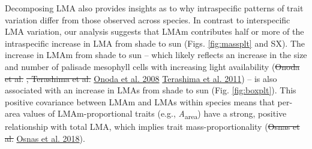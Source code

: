 \documentclass[
  12pt,
]{article}
\providecommand{\DIFaddtex}[1]{{\protect\color{blue}\uwave{#1}}} %
\providecommand{\DIFdeltex}[1]{{\protect\color{red}\sout{#1}}}                      %
\providecommand{\DIFaddbegin}{} %
\providecommand{\DIFaddend}{} %
\providecommand{\DIFdelbegin}{} %
\providecommand{\DIFdelend}{} %
\providecommand{\DIFadd}[1]{\texorpdfstring{\DIFaddtex{#1}}{#1}} %
\providecommand{\DIFdel}[1]{\texorpdfstring{\DIFdeltex{#1}}{}} %
\newcommand{\DIFscaledelfig}{0.5}
\newlength{\DIFdelgraphicswidth} %
\newlength{\DIFdelgraphicsheight} %
\newcommand{\DIFaddincludegraphics}[2][]{{\color{blue}\fbox{\DIFOincludegraphics[#1]{#2}}}} %
\newcommand{\DIFdelincludegraphics}[2][]{%
\sbox{\DIFdelgraphicsbox}{\DIFOincludegraphics[#1]{#2}}%
\settoboxwidth{\DIFdelgraphicswidth}{\DIFdelgraphicsbox} %
\settoboxtotalheight{\DIFdelgraphicsheight}{\DIFdelgraphicsbox} %
\scalebox{\DIFscaledelfig}{%
\parbox[b]{\DIFdelgraphicswidth}{\usebox{\DIFdelgraphicsbox}\\[-\baselineskip] \rule{\DIFdelgraphicswidth}{0em}}\llap{\resizebox{\DIFdelgraphicswidth}{\DIFdelgraphicsheight}{%
\setlength{\unitlength}{\DIFdelgraphicswidth}%
\begin{picture}(1,1)%
\thicklines\linethickness{2pt} %
{\color[rgb]{1,0,0}\put(0,0){\framebox(1,1){}}}%
{\color[rgb]{1,0,0}\put(0,0){\line( 1,1){1}}}%
{\color[rgb]{1,0,0}\put(0,1){\line(1,-1){1}}}%
\end{picture}%
}\hspace*{3pt}}} %
} %
\DeclareRobustCommand{\DIFaddbegin}{\DIFOaddbegin \let\includegraphics\DIFaddincludegraphics} %
\DeclareRobustCommand{\DIFaddend}{\DIFOaddend \let\includegraphics\DIFOincludegraphics} %
\DeclareRobustCommand{\DIFdelbegin}{\DIFOdelbegin \let\includegraphics\DIFdelincludegraphics} %
\DeclareRobustCommand{\DIFdelend}{\DIFOaddend \let\includegraphics\DIFOincludegraphics} %
\begin{document}
Decomposing LMA also provides insights as to why intraspecific patterns of trait variation differ from those observed across species.
In contrast to interspecific LMA variation, our analysis suggests that LMAm contributes half or more of the intraspecific increase in LMA from shade to sun (Figs. \ref{fig:massplt} and SX).
The increase in LMAm from shade to sun -- which likely reflects an increase in the size and number of palisade mesophyll cells with increasing light availability (\DIFdelbegin \DIFdel{Onoda et al. }\DIFdelend \protect\DIFdelbegin %
\DIFdel{, Terashima et al. }\DIFdelend \DIFaddbegin \hyperlink{ref-Onoda2008}{Onoda et al. 2008}\DIFadd{, }\DIFaddend \protect\DIFdelbegin %
\DIFdelend \DIFaddbegin \hyperlink{ref-Terashima2011}{Terashima et al. 2011}\DIFaddend ) -- is also associated with an increase in LMAs from shade to sun (Fig. \ref{fig:boxplt}).
This positive covariance between LMAm and LMAs within species means that per-area values of LMAm-proportional traits (e.g., \emph{A}\textsubscript{area}) have a strong, positive relationship with total LMA, which implies trait mass-proportionality (\DIFdelbegin \DIFdel{Osnas et al. }\DIFdelend \protect\DIFdelbegin %
\DIFdelend \DIFaddbegin \hyperlink{ref-Osnas2018}{Osnas et al. 2018}\DIFaddend ).
\end{document}
